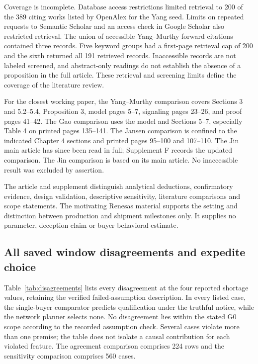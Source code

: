 \documentclass[preprint,11pt,authoryear]{elsarticle}
\begin{document}
Coverage is incomplete. Database access restrictions limited retrieval to 200 of the 389 citing works listed by OpenAlex for the Yang seed. Limits on repeated requests to Semantic Scholar and an access check in Google Scholar also restricted retrieval. The union of accessible Yang--Murthy forward citations contained three records. Five keyword groups had a first-page retrieval cap of 200 and the sixth returned all 191 retrieved records. Inaccessible records are not labeled screened, and abstract-only readings do not establish the absence of a proposition in the full article. These retrieval and screening limits define the coverage of the literature review.

For the closest working paper, the Yang--Murthy comparison covers Sections 3 and 5.2--5.4, Proposition 3, model pages 5--7, signaling pages 23--26, and proof pages 41--42. The Gao comparison uses the model and Sections 5--7, especially Table 4 on printed pages 135--141. The Jansen comparison is confined to the indicated Chapter 4 sections and printed pages 95--100 and 107--110. The Jin main article has since been read in full; Supplement F records the updated comparison. The Jin comparison is based on its main article. No inaccessible result was excluded by assertion.

The article and supplement distinguish analytical deductions, confirmatory evidence, design validation, descriptive sensitivity, literature comparisons and scope statements. The motivating Renesas material supports the setting and distinction between production and shipment milestones only. It supplies no parameter, deception claim or buyer behavioral estimate. 

\subsection{All saved window disagreements and expedite choice}
Table~\ref{tab:disagreements} lists every disagreement at the four reported shortage values, retaining the verified failed-assumption description. In every listed case, the single-buyer comparator predicts qualification under the truthful notice, while the network planner selects none. No disagreement lies within the stated G0 scope according to the recorded assumption check. Several cases violate more than one premise; the table does not isolate a causal contribution for each violated feature. The agreement comparison comprises 224 rows and the sensitivity comparison comprises 560 cases.
\end{document}
